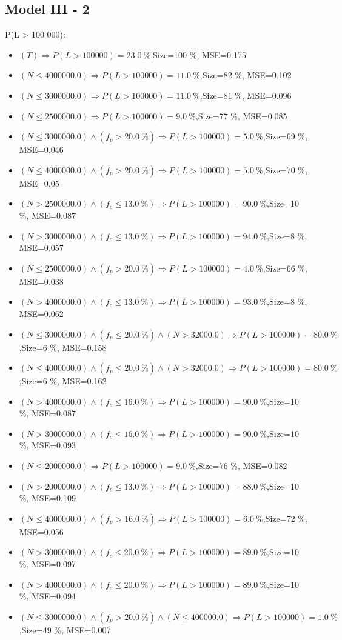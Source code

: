 \documentclass[numbered]{CSL}
\begin{document}
\subsection{Model III - 2}
P(L > 100 000):
\begin{itemize}
\item $(T) \Rightarrow P(L > 100 000) = 23.0~\%$,\hfill Size=100 \%, MSE=0.175
\item $(N \leq 4000000.0) \Rightarrow P(L > 100 000) = 11.0~\%$,\hfill Size=82 \%, MSE=0.102
\item $(N \leq 3000000.0) \Rightarrow P(L > 100 000) = 11.0~\%$,\hfill Size=81 \%, MSE=0.096
\item $(N \leq 2500000.0) \Rightarrow P(L > 100 000) = 9.0~\%$,\hfill Size=77 \%, MSE=0.085
\item $(N \leq 3000000.0) \land (f_p > 20.0~\%) \Rightarrow P(L > 100 000) = 5.0~\%$,\hfill Size=69 \%, MSE=0.046
\item $(N \leq 4000000.0) \land (f_p > 20.0~\%) \Rightarrow P(L > 100 000) = 5.0~\%$,\hfill Size=70 \%, MSE=0.05
\item $(N > 2500000.0) \land (f_c \leq 13.0~\%) \Rightarrow P(L > 100 000) = 90.0~\%$,\hfill Size=10 \%, MSE=0.087
\item $(N > 3000000.0) \land (f_c \leq 13.0~\%) \Rightarrow P(L > 100 000) = 94.0~\%$,\hfill Size=8 \%, MSE=0.057
\item $(N \leq 2500000.0) \land (f_p > 20.0~\%) \Rightarrow P(L > 100 000) = 4.0~\%$,\hfill Size=66 \%, MSE=0.038
\item $(N > 4000000.0) \land (f_c \leq 13.0~\%) \Rightarrow P(L > 100 000) = 93.0~\%$,\hfill Size=8 \%, MSE=0.062
\item $(N \leq 3000000.0) \land (f_p \leq 20.0~\%) \land (N > 32000.0) \Rightarrow P(L > 100 000) = 80.0~\%$,\hfill Size=6 \%, MSE=0.158
\item $(N \leq 4000000.0) \land (f_p \leq 20.0~\%) \land (N > 32000.0) \Rightarrow P(L > 100 000) = 80.0~\%$,\hfill Size=6 \%, MSE=0.162
\item $(N > 4000000.0) \land (f_c \leq 16.0~\%) \Rightarrow P(L > 100 000) = 90.0~\%$,\hfill Size=10 \%, MSE=0.087
\item $(N > 3000000.0) \land (f_c \leq 16.0~\%) \Rightarrow P(L > 100 000) = 90.0~\%$,\hfill Size=10 \%, MSE=0.093
\item $(N \leq 2000000.0) \Rightarrow P(L > 100 000) = 9.0~\%$,\hfill Size=76 \%, MSE=0.082
\item $(N > 2000000.0) \land (f_c \leq 13.0~\%) \Rightarrow P(L > 100 000) = 88.0~\%$,\hfill Size=10 \%, MSE=0.109
\item $(N \leq 4000000.0) \land (f_p > 16.0~\%) \Rightarrow P(L > 100 000) = 6.0~\%$,\hfill Size=72 \%, MSE=0.056
\item $(N > 3000000.0) \land (f_c \leq 20.0~\%) \Rightarrow P(L > 100 000) = 89.0~\%$,\hfill Size=10 \%, MSE=0.097
\item $(N > 4000000.0) \land (f_c \leq 20.0~\%) \Rightarrow P(L > 100 000) = 89.0~\%$,\hfill Size=10 \%, MSE=0.094
\item $(N \leq 3000000.0) \land (f_p > 20.0~\%) \land (N \leq 400000.0) \Rightarrow P(L > 100 000) = 1.0~\%$,\hfill Size=49 \%, MSE=0.007
\end{itemize}
\end{document}
